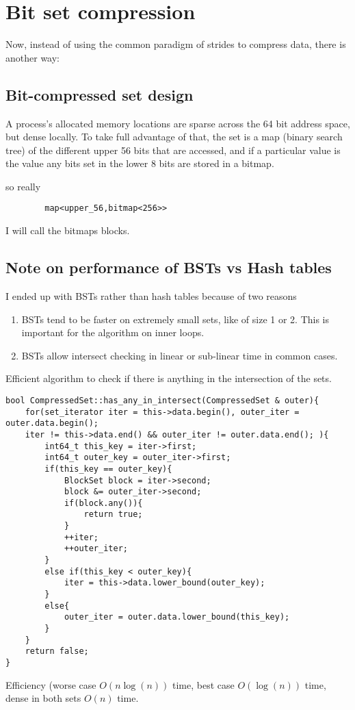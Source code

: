 \documentclass[12pt,twoside]{reedthesis}
\begin{document}
	\section{Bit set compression}

		Now, instead of using the common paradigm of strides to compress data, there is another way:

		\subsection{Bit-compressed set design}

		A process's allocated memory locations are sparse across the 64 bit address space, but dense locally. To take full advantage of that, the set is a map (binary search tree) of the different upper 56 bits that are accessed, and if a particular value is  the value any bits set in the lower 8 bits are stored in a bitmap.

		so really

		\begin{verbatim}
		map<upper_56,bitmap<256>>
		\end{verbatim}

		I will call the bitmaps blocks.

		\subsection{Note on performance of BSTs vs Hash tables}

		I ended up with BSTs rather than hash tables because of two reasons
		\begin{enumerate}
			\item BSTs tend to be faster on extremely small sets, like of size 1 or 2. This is important for the algorithm on inner loops.
			\item BSTs allow intersect checking in linear or sub-linear time in common cases.
		\end{enumerate}

		Efficient algorithm to check if there is anything in the intersection of the sets.
\begin{lstlisting}
bool CompressedSet::has_any_in_intersect(CompressedSet & outer){
	for(set_iterator iter = this->data.begin(), outer_iter = outer.data.begin();
	iter != this->data.end() && outer_iter != outer.data.end(); ){
		int64_t this_key = iter->first;
		int64_t outer_key = outer_iter->first;
		if(this_key == outer_key){
			BlockSet block = iter->second;
			block &= outer_iter->second;
			if(block.any()){
				return true;
			}
			++iter;
			++outer_iter;
		}
		else if(this_key < outer_key){
			iter = this->data.lower_bound(outer_key);
		}
		else{
			outer_iter = outer.data.lower_bound(this_key);
		}
	}
	return false;
}
\end{lstlisting}
		Efficiency (worse case $O(n\log(n))$ time, best case $O(\log(n))$ time, dense in both sets $O(n)$ time.
\end{document}
